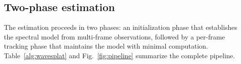 \documentclass[review]{elsarticle}
\begin{document}
\subsection{Two-phase estimation}

The estimation proceeds in two phases: an initialization phase that
establishes the spectral model from multi-frame observations, followed
by a per-frame tracking phase that maintains the model with
minimal computation.  Table~\ref{alg:wavesplat} and Fig.~\ref{fig:pipeline} summarize
the complete pipeline.

\end{document}
